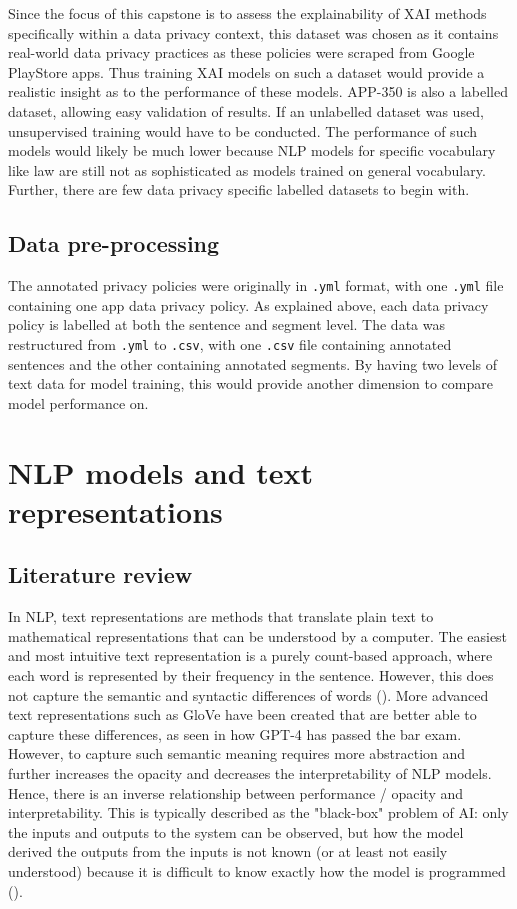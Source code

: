 Since the focus of this capstone is to assess the explainability of XAI methods specifically within a data privacy context, this dataset was chosen as it contains real-world data privacy practices as these policies were scraped from Google PlayStore apps. Thus training XAI models on such a dataset would provide a realistic insight as to the performance of these models. APP-350 is also a labelled dataset, allowing easy validation of results. If an unlabelled dataset was used, unsupervised training would have to be conducted. The performance of such models would likely be much lower because NLP models for specific vocabulary like law are still not as sophisticated as models trained on general vocabulary. Further, there are few data privacy specific labelled datasets to begin with. 

\subsection{Data pre-processing}
The annotated privacy policies were originally in \texttt{.yml} format, with one \texttt{.yml} file containing one app data privacy policy. As explained above, each data privacy policy is labelled at both the sentence and segment level. The data was restructured from \texttt{.yml} to \texttt{.csv}, with one \texttt{.csv} file containing annotated sentences and the other containing annotated segments. By having two levels of text data for model training, this would provide another dimension to compare model performance on.

\section{NLP models and text representations}
\subsection{Literature review}
In NLP, text representations are methods that translate plain text to mathematical representations that can be understood by a computer. The easiest and most intuitive text representation is a purely count-based approach, where each word is represented by their frequency in the sentence. However, this does not capture the semantic and syntactic differences of words (\cite{liu2020word}). More advanced text representations such as GloVe have been created that are better able to capture these differences, as seen in how GPT-4 has passed the bar exam. However, to capture such semantic meaning requires more abstraction and further increases the opacity and decreases the interpretability of NLP models. Hence, there is an inverse relationship between performance / opacity and interpretability.  This is typically described as the "black-box" problem of AI: only the inputs and outputs to the system can be observed, but how the model derived the outputs from the inputs is not known (or at least not easily understood) because it is difficult to know exactly how the model is programmed (\cite{zednik2021}).


